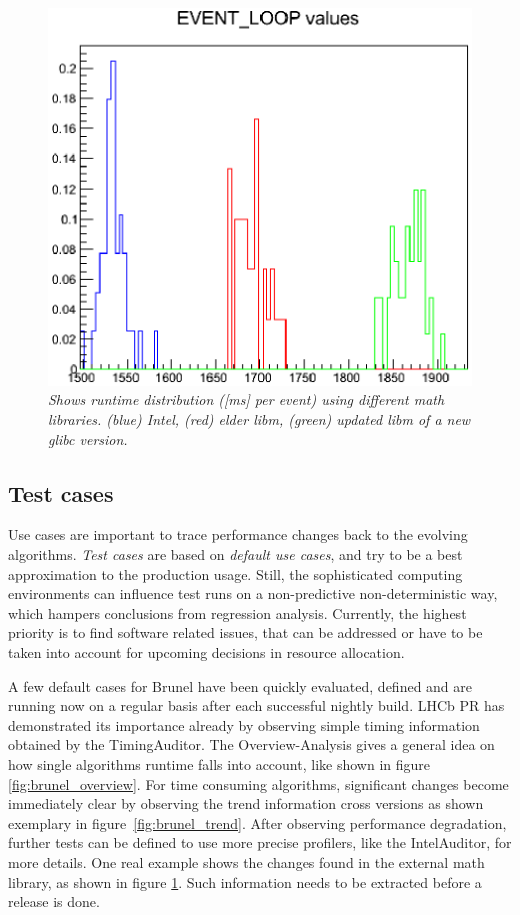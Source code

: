 \documentclass[a4paper]{jpconf}
\begin{document}
\begin{figure}[t]
\begin{minipage}[t]{0.29\textwidth}
\includegraphics[scale=0.40]{figures/brunel_basic_libm.eps}
\caption{\small \textit{Shows runtime distribution ([ms] per event) using different math libraries. (blue) Intel, (red) elder libm, (green) updated libm of a new glibc version.}}
\label{fig:brunel_basic_libm}
\end{minipage}
\end{figure}

\subsection{Test cases}
\label{sec:test_cases}

Use cases are important to trace performance changes back to the evolving algorithms. \textit{Test cases} are based on \textit{default use cases}, and try to be a best approximation to the production usage. Still, the sophisticated computing environments can influence test runs on a non-predictive non-deterministic way, which hampers conclusions from regression analysis. Currently, the highest priority is to find software related issues, that can be addressed or have to be taken into account for upcoming decisions in resource allocation.

A few default cases for Brunel have been quickly evaluated, defined and are running now on a regular basis after each successful nightly build. LHCb PR has demonstrated its importance already by observing simple timing information obtained by the TimingAuditor. The Overview-Analysis gives a general idea on how single algorithms runtime falls into account, like shown in figure \ref{fig:brunel_overview}. For time consuming algorithms, significant changes become immediately clear by observing the trend information cross versions as shown exemplary in \mbox{figure \ref{fig:brunel_trend}}. After observing performance degradation, further tests can be defined to use more precise profilers, like the IntelAuditor, for more details. One real example shows the changes found in the external math library, as shown in figure \ref{fig:brunel_basic_libm}. Such information needs to be extracted before a release is done.
\end{document}
